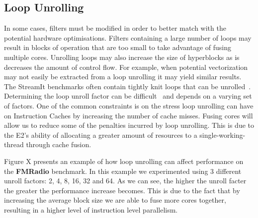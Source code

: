 \subsection{Loop Unrolling}
In some cases, filters must be modified in order to better match with the potential hardware optimisations.
Filters containing a large number of loops may result in blocks of operation that are too small to take advantage of fusing multiple cores.
Unrolling loops may also increase the size of hyperblocks as is decreases the amount of control flow.
For example, when potential vectorization may not easily be extracted from a loop unrolling it may yield similar results.
The StreamIt benchmarks often contain tightly knit loops that can be unrolled~\cite{}.
Determining the loop unroll factor can be difficult~\cite{} and depends on a varying set of factors.
One of the common constraints is on the stress loop unrolling can have on Instruction Caches by increasing the number of cache misses.
Fusing cores will allow us to reduce some of the penalties incurred by loop unrolling.
This is due to the E2's ability of allocating a greater amount of resources to a single-working-thread through cache fusion.

Figure X presents an example of how loop unrolling can affect performance on the \textbf{FMRadio} benchmark.
In this example we experimented using 3 different unroll factors: 2, 4, 8, 16, 32 and 64.
As we can see, the higher the unroll facter the greater the performance increase becomes.
This is due to the fact that by increasing the average block size we are able to fuse more cores together, resulting in a higher level of instruction level parallelism. 


